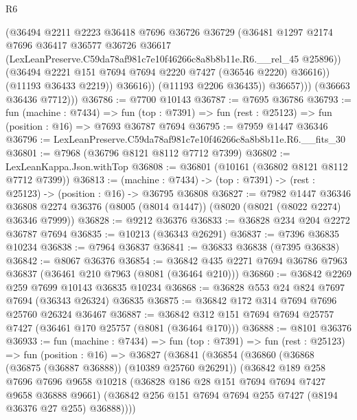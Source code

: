 \begin{lexlean}{R6}
\begin{coremodule}
                      (@36494
                        @2211
                        @2223
                        @36418
                        @7696
                        @36726
                        @36729
                        (@36481
                          @1297
                          @2174
                          @7696
                          @36417
                          @36577
                          @36726
                          @36617
                          (LexLeanPreserve.C59da78af981c7e10f46266c8a8b8b11e.R6.__rel_45 @25896))
                        (@36494 @2221 @151 @7694 @7694 @2220 @7427 (@36546 @2220) @36616))
                      (@11193 @36433 @2219))
                    @36616))
                (@11193 @2206 @36435))
              @36657)))
        (@36663 @36436 @7712)))
@36786 := @7700 @10143
@36787 := @7695 @36786
@36793 := fun (machine : @7434) =>
  fun (top : @7391) => fun (rest : @25123) => fun (position : @16) => @7693 @36787 @7694
@36795 := @7959 @1447 @36346
@36796 := LexLeanPreserve.C59da78af981c7e10f46266c8a8b8b11e.R6.__fits_30
@36801 := @7968 (@36796 @8121 @8112 @7712 @7399)
@36802 := LexLeanKappa.Json.withTop
@36808 := @36801 (@10161 (@36802 @8121 @8112 @7712 @7399))
@36813 := (machine : @7434) -> (top : @7391) -> (rest : @25123) -> (position : @16) -> @36795 @36808
@36827 := @7982
    @1447
    @36346
    @36808
    @2274
    @36376
    (@8005 (@8014 @1447))
    (@8020 (@8021 (@8022 @2274) @36346 @7999))
@36828 := @9212 @36376
@36833 := @36828 @234 @204 @2272 @36787 @7694
@36835 := @10213 (@36343 @26291)
@36837 := @7396 @36835 @10234
@36838 := @7964 @36837
@36841 := @36833 @36838 (@7395 @36838)
@36842 := @8067 @36376
@36854 := @36842 @435 @2271 @7694 @36786 @7963 @36837 (@36461 @210 @7963 (@8081 (@36464 @210)))
@36860 := @36842 @2269 @259 @7699 @10143 @36835 @10234
@36868 := @36828 @553 @24 @824 @7697 @7694 (@36343 @26324) @36835
@36875 := @36842 @172 @314 @7694 @7696 @25760 @26324 @36467
@36887 := @36842 @312 @151 @7694 @7694 @25757 @7427 (@36461 @170 @25757 (@8081 (@36464 @170)))
@36888 := @8101 @36376
@36933 := fun (machine : @7434) =>
  fun (top : @7391) =>
  fun (rest : @25123) =>
  fun (position : @16) =>
  @36827
    (@36841
      (@36854
        (@36860
          (@36868 (@36875 (@36887 @36888)) (@10389 @25760 @26291))
          (@36842
            @189
            @258
            @7696
            @7696
            @9658
            @10218
            (@36828 @186 @28 @151 @7694 @7694 @7427 @9658 @36888 @9661)
            (@36842 @256 @151 @7694 @7694 @255 @7427 (@8194 @36376 @27 @255) @36888))))

\end{coremodule}
\end{lexlean}
